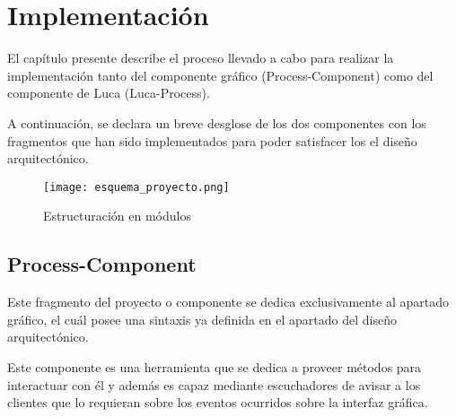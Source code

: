 	\chapter{Implementación}
	
	El capítulo presente describe el proceso llevado a cabo para realizar la implementación tanto del componente gráfico (Process-Component) como del componente de Luca (Luca-Process).
	
	\vspace{5mm}
	
	A continuación, se declara un breve desglose de los dos componentes con los fragmentos que han sido implementados para poder satisfacer los el diseño arquitectónico.
	
	\begin{figure}[H]
		\centering
		\texttt{[image: esquema\_proyecto.png]}
		\caption{Estructuración en módulos}\label{fig:esquema_proyecto}
	\end{figure}
	
	\minitoc
	
		\section{Process-Component}
		
		Este fragmento del proyecto o componente se dedica exclusivamente al apartado gráfico, el cuál posee una sintaxis ya definida en el apartado del diseño arquitectónico.
		
		
		\vspace{5mm}
		
		
		Este componente es una herramienta que se dedica a proveer métodos para interactuar con él y además es capaz mediante escuchadores de avisar a los clientes que lo requieran sobre los eventos ocurridos sobre la interfaz gráfica.
		
		\vspace{5mm}
		
